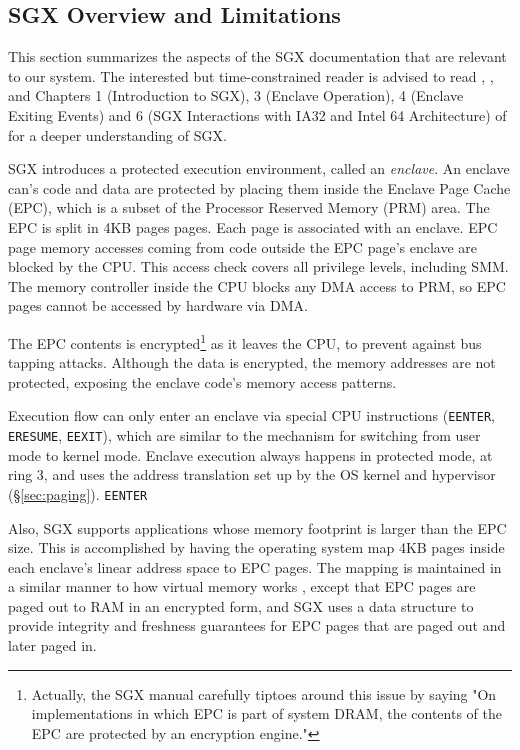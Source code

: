 \subsection{SGX Overview and Limitations}
\label{sec:sgx}

This section summarizes the aspects of the SGX documentation that are relevant
to our system. The interested but time-constrained reader is advised to read
\cite{mckeen2013innovative}, \cite{anati2013sgx}, and Chapters 1 (Introduction
to SGX), 3 (Enclave Operation), 4 (Enclave Exiting Events) and 6 (SGX
Interactions with IA32 and Intel 64 Architecture) of \cite{intel2013sgxmanual}
for a deeper understanding of SGX.

SGX introduces a protected execution environment, called an \textit{enclave}.
An enclave can's code and data are protected by placing them inside the Enclave
Page Cache (EPC), which is a subset of the Processor Reserved Memory (PRM)
area. The EPC is split in 4KB pages pages. Each page is associated with an
enclave. EPC page memory accesses coming from code outside the EPC page's
enclave are blocked by the CPU. This access check covers all privilege levels,
including SMM. The memory controller inside the CPU blocks any DMA access to
PRM, so EPC pages cannot be accessed by hardware via DMA.

The EPC contents is encrypted\footnote{Actually, the SGX manual carefully
tiptoes around this issue by saying "On implementations in which EPC is part of
system DRAM, the contents of the EPC are protected by an encryption engine."}
as it leaves the CPU, to prevent against bus tapping attacks. Although the data
is encrypted, the memory addresses are not protected, exposing the enclave
code's memory access patterns.

Execution flow can only enter an enclave via special CPU instructions
(\texttt{EENTER}, \texttt{ERESUME}, \texttt{EEXIT}), which are similar to the
mechanism for switching from user mode to kernel mode. Enclave execution always
happens in protected mode, at ring 3, and uses the address translation set up
by the OS kernel and hypervisor (\S \ref{sec:paging}). \texttt{EENTER}


Also, SGX
supports applications whose memory footprint is larger than the EPC size. This
is accomplished by having the operating system map 4KB pages inside each
enclave's linear address space to EPC pages. The mapping is maintained in a
similar manner to how virtual memory works \cite{jacob1998virtual}, except that
EPC pages are paged out to RAM in an encrypted form, and SGX uses a data
structure to provide integrity and freshness guarantees for EPC pages that are
paged out and later paged in.



